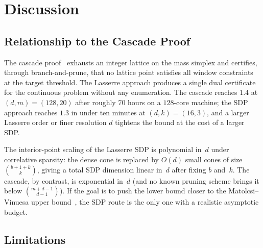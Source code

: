 \documentclass[11pt, letterpaper]{article}
\theoremstyle{paperplain}
\theoremstyle{paperdef}
\begin{document}
\section{Discussion}\label{sec:discussion}

\subsection{Relationship to the Cascade Proof}

The cascade proof~\cite{BajajCS2026} exhausts an integer lattice on
the mass simplex and certifies, through branch-and-prune, that no
lattice point satisfies all window constraints at the target
threshold.  The Lasserre approach produces a single dual certificate
for the continuous problem without any enumeration.  The cascade
reaches $1.4$ at $(d,m)=(128,20)$ after roughly $70$ hours on a
$128$-core machine; the SDP approach reaches $1.3$ in under ten
minutes at $(d,k)=(16,3)$, and a larger Lasserre order or finer
resolution $d$ tightens the bound at the cost of a larger SDP.

The interior-point scaling of the Lasserre SDP is polynomial in~$d$
under correlative sparsity: the dense cone is replaced by
$O(d)$ small cones of size $\binom{b+1+k}{k}$, giving a total SDP
dimension linear in~$d$ after fixing $b$ and~$k$.  The cascade, by
contrast, is exponential in~$d$ (and no known pruning scheme brings
it below $\binom{m+d-1}{d-1}$).  If the goal is to push the lower
bound closer to the Matolcsi--Vinuesa upper bound~\cite{MV10}, the
SDP route is the only one with a realistic asymptotic budget.

\subsection{Limitations}
\end{document}

